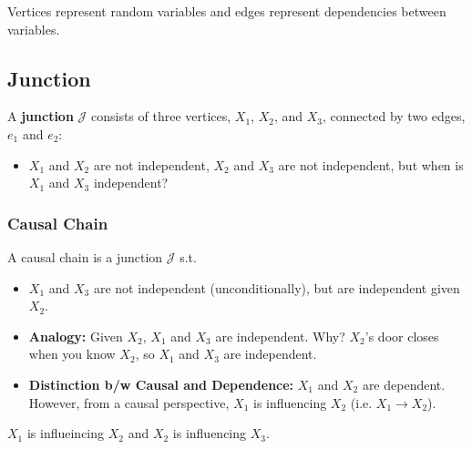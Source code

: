 \begin{definition}
    Vertices represent random variables and edges represent dependencies between variables.
\end{definition}

\subsection{Junction}
\begin{definition}
    A \textbf{junction} $\mathcal{J}$ consists of three vertices, $X_1$, $X_2$, and $X_3$, connected by two edges, $e_1$ and $e_2$:
    \begin{itemize}
        \item $X_1$ and $X_2$ are not independent, $X_2$ and $X_3$ are not independent, but when is $X_1$ and $X_3$ independent?
    \end{itemize}
\end{definition}

\subsubsection{Causal Chain}
\begin{definition}
    A causal chain is a junction $\mathcal{J}$ s.t. 
    \begin{itemize}
        \item $X_1$ and $X_3$ are not independent (unconditionally), but are independent given $X_2$.
    \end{itemize}
\end{definition}

\begin{notes}
    \begin{itemize}
        \item \textbf{Analogy:}  Given $X_2$, $X_1$ and $X_3$ are independent. Why? $X_2$'s door closes when you know $X_2$, so $X_1$ and $X_3$ are independent.
        \item \textbf{Distinction b/w Causal and Dependence:} $X_1$ and $X_2$ are dependent. However, from a causal perspective, $X_1$ is influencing $X_2$ (i.e. $X_1 \rightarrow X_2$).
    \end{itemize}
\end{notes}

\begin{warning}
    $X_1$ is influeincing $X_2$ and $X_2$ is influencing $X_3$.
\end{warning}

